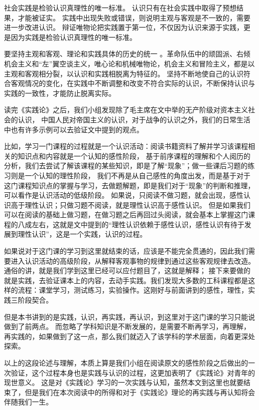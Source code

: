 \documentclass[a4paper, UTF8, onecolumn]{ctexart}
\begin{document}
社会实践是检验认识真理性的唯一标准。
认识只有在社会实践中取得了预想结果，才能被证实。
实践中出现失败或错误，则说明主观与客观是不一致的，需要进一步改进认识。
辩证唯物论把实践置于第一位，不仅因为认识来源于实践，更是因为实践是检验认识真理性的唯一标准。

要坚持主观和客观、理论和实践具体的历史的统一
。革命队伍中的顽固派、右倾机会主义和“左”翼空谈主义，唯心论和机械唯物论，机会主义和冒险主义，都是以主观和客观相分裂，以认识和实践相脱离为特征的。
坚持不断地使自己的认识符合客观情况的变化，在实践中不断调整和改变不符合实际的认识，不断保持认识与实践的一致性，才能防止脱离实际。

读完《实践论》之后，我们小组发现除了毛主席在文中举的无产阶级对资本主义社会的认识，
中国人民对帝国主义的认识，对于战争的认识之外，我们的日常生活中也有许多示例可以去验证文中提到的观点。

比如，学习一门课程的过程就是一个认识活动：阅读书籍资料了解并学习该课程相关的知识点和内容就是一个认知的感性阶段，
基于前序课程的理解和个人阅历的分析，我们去尝试了解该课程的某些知识，即是了解“现象”；做一些课后习题的练习则是一个认知的理性阶段，
我们不再是从自己感性的角度出发，而是基于对于这门课程知识点的掌握与学习，去做题解题，即是我们对于“现象”的判断和推理，可以看作是认识活动的低级阶段。
如果说，只阅读不做习题，就会出现，感性认识高于理性认识；只做习题不阅读，就是理性认识高于感性认识。
但是如果我们可以在阅读的基础上做习题，在做习题之后再回过头阅读，就会基本上掌握这门课程的八成左右，这就是文中提到的“理性认识依赖于感性认识，感性认识有待于发展到理性认识”，这是一个实践，认识的过程。

如果说对于这门课的学习到这里就结束的话，应该是不能完全贯通的，因此我们需要进入认识活动的高级阶段，从解释客观事物的规律到通过这些客观规律去改造。
通俗的讲，就是我们学到这里已经可以应付题目了，这就是解释；
接下来要做的就是实践，去验证课本上的内容，去动手实践。我们发现大多数的工科课程都是这样的流程：课堂学习，测试练习，实验操作。这刚好与前面讲到的感性，理性，实践三阶段契合。

但是本书讲到的是实践，认识，再实践，再认识，到这里对于这门课的学习只能说做到了前两点。
而忽略了学科知识是不断发展的，是需要不断再学习，再理解，再实践的，如果做到了这一点，那么我们就迈入了该学科的学术层面，向着更深处探索。

以上的这段论述与理解，本质上算是我们小组在阅读原文的感性阶段之后做出的一次验证，这个过程本身也是实践与认识的过程，这更加表明了《实践论》对青年的现世意义。
这是对《实践论》学习的一次实践与认知，虽然本文到这里也就要结束了，但是我们在本次阅读中的所得和对于《实践论》理论的再实践与再认知将会伴随我们一生。
\end{document}
